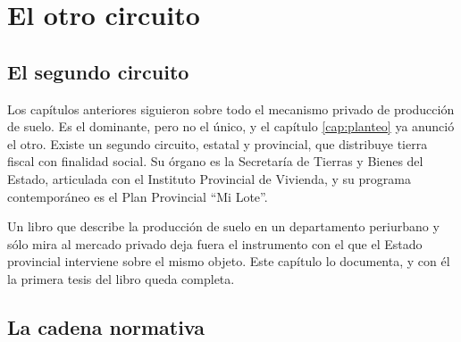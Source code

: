 \chapter{El otro circuito}

\label{cap:tierrafiscal}
\section{El segundo circuito}

Los capítulos anteriores siguieron sobre todo el mecanismo privado de producción de suelo. Es el dominante, pero no el único, y el capítulo \ref{cap:planteo} ya anunció el otro. Existe un segundo circuito, estatal y provincial, que distribuye tierra fiscal con finalidad social. Su órgano es la Secretaría de Tierras y Bienes del Estado, articulada con el Instituto Provincial de Vivienda, y su programa contemporáneo es el Plan Provincial ``Mi Lote''.

Un libro que describe la producción de suelo en un departamento periurbano y sólo mira al mercado privado deja fuera el instrumento con el que el Estado provincial interviene sobre el mismo objeto. Este capítulo lo documenta, y con él la primera tesis del libro queda completa.

\section{La cadena normativa}


